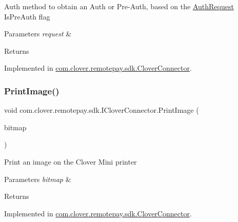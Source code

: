Auth method to obtain an Auth or Pre-\/\+Auth, based on the \hyperlink{classcom_1_1clover_1_1remotepay_1_1sdk_1_1_auth_request}{Auth\+Request} Is\+Pre\+Auth flag 


\begin{DoxyParams}{Parameters}
{\em request} & \\
\hline
\end{DoxyParams}
\begin{DoxyReturn}{Returns}

\end{DoxyReturn}


Implemented in \hyperlink{classcom_1_1clover_1_1remotepay_1_1sdk_1_1_clover_connector_ab770dbea796bfc3ffa1d0ed999d04b48}{com.\+clover.\+remotepay.\+sdk.\+Clover\+Connector}.

\mbox{\label{interfacecom_1_1clover_1_1remotepay_1_1sdk_1_1_i_clover_connector_ac716d55882598b92984159f4898bbe2a}} 
\subsubsection{\texorpdfstring{Print\+Image()}{PrintImage()}}
{\footnotesize\ttfamily void com.\+clover.\+remotepay.\+sdk.\+I\+Clover\+Connector.\+Print\+Image (\begin{DoxyParamCaption}\item[{Bitmap}]{bitmap }\end{DoxyParamCaption})}



Print an image on the Clover Mini printer 


\begin{DoxyParams}{Parameters}
{\em bitmap} & \\
\hline
\end{DoxyParams}
\begin{DoxyReturn}{Returns}

\end{DoxyReturn}


Implemented in \hyperlink{classcom_1_1clover_1_1remotepay_1_1sdk_1_1_clover_connector_a4743d4155d22ddc978602814cb72ee6b}{com.\+clover.\+remotepay.\+sdk.\+Clover\+Connector}.

